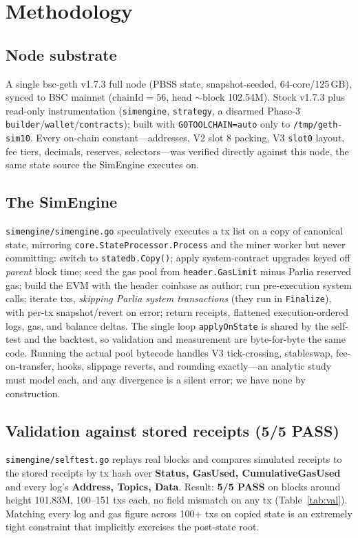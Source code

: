 \documentclass[11pt]{article}
\newcommand{\code}[1]{\texttt{#1}}
\begin{document}
\section{Methodology}

\subsection{Node substrate}
A single bsc-geth v1.7.3 full node (PBSS state, snapshot-seeded, 64-core/125\,GB),
synced to BSC mainnet ($\text{chainId}=56$, head $\sim$block 102.54M). Stock
v1.7.3 plus read-only instrumentation (\code{simengine}, \code{strategy}, a disarmed
Phase-3 \code{builder}/\code{wallet}/\code{contracts}); built with
\code{GOTOOLCHAIN=auto} only to \code{/tmp/geth-sim10}. Every on-chain
constant---addresses, V2 slot 8 packing, V3 \code{slot0} layout, fee tiers,
decimals, reserves, selectors---was verified directly against this node, the same
state source the SimEngine executes on.

\subsection{The SimEngine}
\code{simengine/simengine.go} speculatively executes a tx list on a copy of
canonical state, mirroring \code{core.StateProcessor.Process} and the miner worker
but never committing: switch to \code{statedb.Copy()}; apply system-contract upgrades
keyed off \emph{parent} block time; seed the gas pool from \code{header.GasLimit}
minus Parlia reserved gas; build the EVM with the header coinbase as author; run
pre-execution system calls; iterate txs, \emph{skipping Parlia system transactions}
(they run in \code{Finalize}), with per-tx snapshot/revert on error; return
receipts, flattened execution-ordered logs, gas, and balance deltas. The single loop
\code{applyOnState} is shared by the self-test and the backtest, so validation and
measurement are byte-for-byte the same code. Running the actual pool bytecode handles
V3 tick-crossing, stableswap, fee-on-transfer, hooks, slippage reverts, and rounding
exactly---an analytic study must model each, and any divergence is a silent error;
we have none by construction.

\subsection{Validation against stored receipts (5/5 PASS)}
\label{sec:validation}
\code{simengine/selftest.go} replays real blocks and compares simulated receipts to
the stored receipts by tx hash over \textbf{Status, GasUsed, CumulativeGasUsed} and
every log's \textbf{Address, Topics, Data}. Result: \textbf{5/5 PASS} on blocks
around height 101.83M, 100--151 txs each, no field mismatch on any tx
(Table~\ref{tab:val}). Matching every log and gas figure across 100+ txs on copied
state is an extremely tight constraint that implicitly exercises the post-state root.
\end{document}
